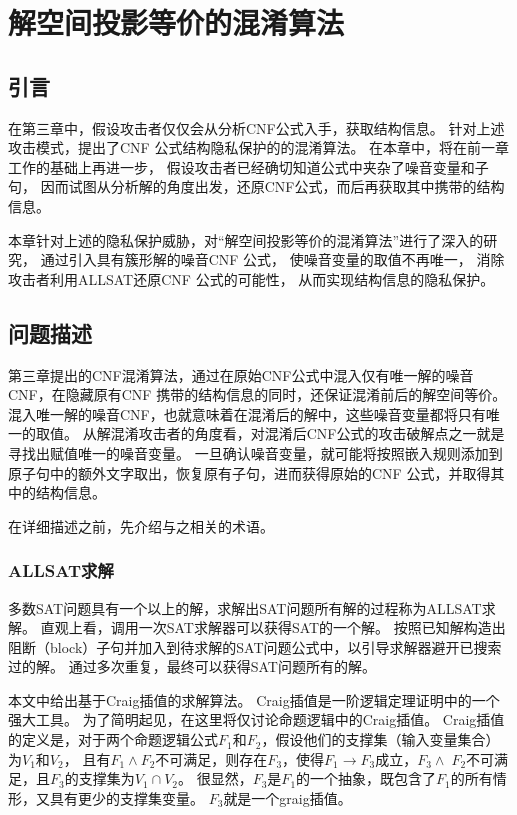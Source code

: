 \chapter{解空间投影等价的混淆算法}
\label{chap:4}

\section{引言}%
在第三章中，假设攻击者仅仅会从分析CNF公式入手，获取结构信息。
针对上述攻击模式，提出了CNF 公式结构隐私保护的的混淆算法。
在本章中，将在前一章工作的基础上再进一步，
假设攻击者已经确切知道公式中夹杂了噪音变量和子句，
因而试图从分析解的角度出发，还原CNF公式，而后再获取其中携带的结构信息。

本章针对上述的隐私保护威胁，对“解空间投影等价的混淆算法”进行了深入的研究，
通过引入具有簇形解的噪音CNF 公式，
使噪音变量的取值不再唯一，
消除攻击者利用ALLSAT还原CNF 公式的可能性，
从而实现结构信息的隐私保护。

\section{问题描述}
第三章提出的CNF混淆算法，通过在原始CNF公式中混入仅有唯一解的噪音CNF，在隐藏原有CNF 携带的结构信息的同时，还保证混淆前后的解空间等价。
混入唯一解的噪音CNF，也就意味着在混淆后的解中，这些噪音变量都将只有唯一的取值。
从解混淆攻击者的角度看，对混淆后CNF公式的攻击破解点之一就是寻找出赋值唯一的噪音变量。
一旦确认噪音变量，就可能将按照嵌入规则添加到原子句中的额外文字取出，恢复原有子句，进而获得原始的CNF 公式，并取得其中的结构信息。

在详细描述之前，先介绍与之相关的术语。
\subsection{ALLSAT求解}
多数SAT问题具有一个以上的解，求解出SAT问题所有解的过程称为ALLSAT求解。
直观上看，调用一次SAT求解器可以获得SAT的一个解。
按照已知解构造出阻断（block）子句并加入到待求解的SAT问题公式中，以引导求解器避开已搜索过的解。
通过多次重复，最终可以获得SAT问题所有的解。

本文中给出基于Craig插值的求解算法。
Craig插值是一阶逻辑定理证明中的一个强大工具。
为了简明起见，在这里将仅讨论命题逻辑中的Craig插值。
Craig插值的定义是，对于两个命题逻辑公式$F_1$和$F_2$，假设他们的支撑集（输入变量集合）为$V_1$和$V_2$，
且有$F_1\wedge F_2$不可满足，则存在$F_3$，使得$F_1\rightarrow F_3$成立，$F_3\wedgeF_2$不可满足，且$F_3$的支撑集为$V_1\cap V_2$。
很显然，$F_3$是$F_1$的一个抽象，既包含了$F_1$的所有情形，又具有更少的支撑集变量。
$F_3$就是一个graig插值。

